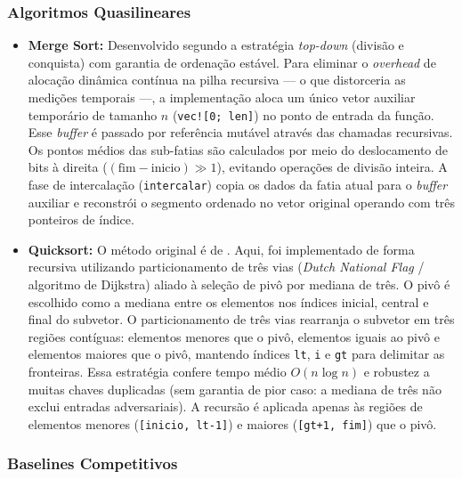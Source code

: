 \documentclass[portuguese]{sbc2025}%
\begin{document}
\subsubsection{Algoritmos Quasilineares}

\begin{itemize}
    \item \textbf{Merge Sort:} Desenvolvido segundo a estratégia \emph{top-down} (divisão e conquista) com garantia de ordenação estável. Para eliminar o \emph{overhead} de alocação dinâmica contínua na pilha recursiva — o que distorceria as medições temporais —, a implementação aloca um único vetor auxiliar temporário de tamanho $n$ (\texttt{vec![0; len]}) no ponto de entrada da função. Esse \emph{buffer} é passado por referência mutável através das chamadas recursivas. Os pontos médios das sub-fatias são calculados por meio do deslocamento de bits à direita ($(\text{fim} - \text{inicio}) \gg 1$), evitando operações de divisão inteira. A fase de intercalação (\texttt{intercalar}) copia os dados da fatia atual para o \emph{buffer} auxiliar e reconstrói o segmento ordenado no vetor original operando com três ponteiros de índice.

    \item \textbf{Quicksort:} O método original é de \citet{hoare_quicksort_1962}. Aqui, foi implementado de forma recursiva utilizando particionamento de três vias (\emph{Dutch National Flag} / algoritmo de Dijkstra) aliado à seleção de pivô por mediana de três. O pivô é escolhido como a mediana entre os elementos nos índices inicial, central e final do subvetor. O particionamento de três vias rearranja o subvetor em três regiões contíguas: elementos menores que o pivô, elementos iguais ao pivô e elementos maiores que o pivô, mantendo índices \texttt{lt}, \texttt{i} e \texttt{gt} para delimitar as fronteiras. Essa estratégia confere tempo médio $O(n \log n)$ e robustez a muitas chaves duplicadas (sem garantia de pior caso: a mediana de três não exclui entradas adversariais). A recursão é aplicada apenas às regiões de elementos menores (\texttt{[inicio, lt-1]}) e maiores (\texttt{[gt+1, fim]}) que o pivô.
\end{itemize}

\subsubsection{Baselines Competitivos}
\end{document}
